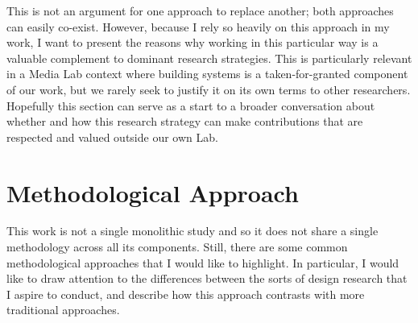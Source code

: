 This is not an argument for one approach to replace another; both approaches can easily co-exist. However, because I rely so heavily on this approach in my work, I want to present the reasons why working in this particular way is a valuable complement to dominant research strategies. This is particularly relevant in a Media Lab context where building systems is a taken-for-granted component of our work, but we rarely seek to justify it on its own terms to other researchers. Hopefully this section can serve as a start to a broader conversation about whether and how this research strategy can make contributions that are respected and valued outside our own Lab.

\section{Methodological Approach}



This work is not a single monolithic study and so it does not share a single methodology across all its components. Still, there are some common methodological approaches that I would like to highlight. In particular, I would like to draw attention to the differences between the sorts of design research that I aspire to conduct, and describe how this approach contrasts with more traditional approaches. 

